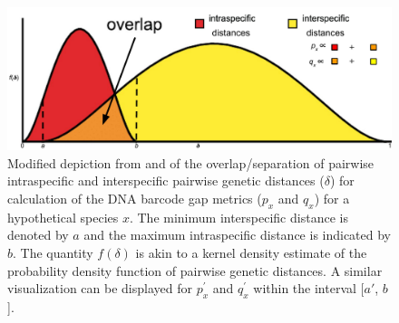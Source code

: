 \documentclass[12pt]{article}
\begin{document}
\begin{figure}[H]

\centering

\includegraphics[width=1.0\textwidth]{Figure 1}

\caption{Modified depiction from \citet{meyer2005dna} and \citet{phillips2024measure} of the overlap/separation of pairwise intraspecific and interspecific pairwise genetic distances ($\delta$) for calculation of the DNA barcode gap metrics ($p_x$ and $q_x$) for a hypothetical species $x$. The minimum interspecific distance is denoted by $a$ and the maximum intraspecific distance is indicated by $b$. The quantity $f(\delta)$ is akin to a kernel density estimate of the probability density function of pairwise genetic distances. A similar visualization can be displayed for $p^{'}_x$ and $q^{'}_x$ within the interval [$a'$, $b$].}

\end{figure}

\newpage
\end{document}
